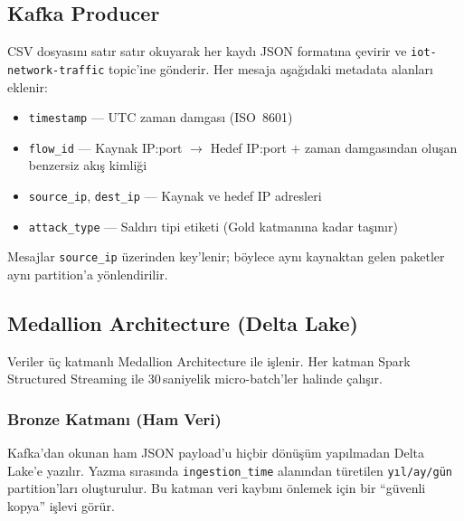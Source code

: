 \documentclass[12pt,a4paper]{article}
\begin{document}
\subsection{Kafka Producer}
CSV dosyasını satır satır okuyarak her kaydı JSON formatına çevirir ve \texttt{iot-network-traffic} topic'ine gönderir. Her mesaja aşağıdaki metadata alanları eklenir:
\begin{itemize}[noitemsep]
  \item \texttt{timestamp} — UTC zaman damgası (ISO~8601)
  \item \texttt{flow\_id} — Kaynak IP:port $\to$ Hedef IP:port $+$ zaman damgasından oluşan benzersiz akış kimliği
  \item \texttt{source\_ip}, \texttt{dest\_ip} — Kaynak ve hedef IP adresleri
  \item \texttt{attack\_type} — Saldırı tipi etiketi (Gold katmanına kadar taşınır)
\end{itemize}

Mesajlar \texttt{source\_ip} üzerinden key'lenir; böylece aynı kaynaktan gelen paketler aynı partition'a yönlendirilir.

\subsection{Medallion Architecture (Delta Lake)}

Veriler üç katmanlı Medallion Architecture ile işlenir. Her katman Spark Structured Streaming ile 30\,saniyelik micro-batch'ler halinde çalışır.

\subsubsection{Bronze Katmanı (Ham Veri)}
Kafka'dan okunan ham JSON payload'u hiçbir dönüşüm yapılmadan Delta Lake'e yazılır. Yazma sırasında \texttt{ingestion\_time} alanından türetilen \texttt{yıl/ay/gün} partition'ları oluşturulur. Bu katman veri kaybını önlemek için bir ``güvenli kopya'' işlevi görür.
\end{document}
